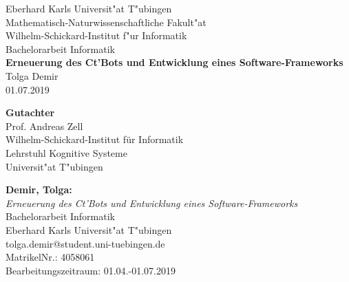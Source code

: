\documentclass[twoside,11pt, a4paper]{report}
\begin{document}
	
	
	\begin{titlepage}
		\begin{center}
			{\LARGE Eberhard Karls Universit"at T"ubingen}\\
			{\large Mathematisch-Naturwissenschaftliche Fakult"at \\
				Wilhelm-Schickard-Institut f"ur Informatik\\[4cm]}
			{\huge Bachelorarbeit Informatik\\[2cm]}
			{\Large\bf  Erneuerung des Ct'Bots und Entwicklung eines Software-Frameworks\\[1.5cm]}
			{\large Tolga Demir}\\[0.5cm]
			01.07.2019\\[3cm]
			\begin{center}{\small\bf Gutachter}\\[0.5cm]
				{\large Prof. Andreas Zell}\\
				{\footnotesize Wilhelm-Schickard-Institut f\"ur Informatik\\
					Lehrstuhl Kognitive Systeme\\
					Universit"at T"ubingen}	\end{center}
			
			
			
		\end{center}
	\end{titlepage}
	
	
	\thispagestyle{empty}
	\vspace*{\fill}
	\begin{minipage}{11.2cm}
		\textbf{Demir, Tolga:}\\
		\emph{Erneuerung des Ct'Bots und Entwicklung eines Software-Frameworks}\\ Bachelorarbeit Informatik\\
		Eberhard Karls Universit"at T"ubingen\\
		tolga.demir@student.uni-tuebingen.de\\
		MatrikelNr.: 4058061\\
		Bearbeitungszeitraum: 01.04.-01.07.2019
	\end{minipage}
	\newpage
	
\end{document}
